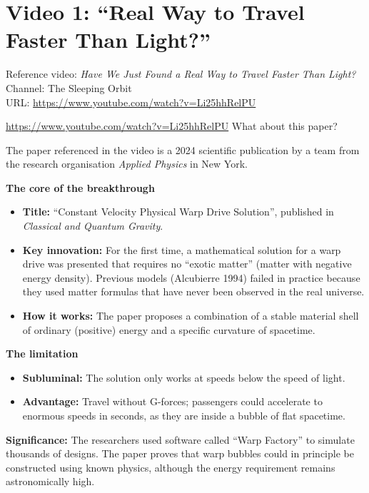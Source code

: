 
\section{Video 1: ``Real Way to Travel Faster Than Light?''}

\begin{videobox}
Reference video: \emph{Have We Just Found a Real Way to Travel Faster Than Light?} \\
Channel: The Sleeping Orbit \\
URL: \url{https://www.youtube.com/watch?v=Li25hhRelPU}
\end{videobox}

\begin{userbox}
\url{https://www.youtube.com/watch?v=Li25hhRelPU} \quad What about this paper?
\end{userbox}

\begin{geminibox}
The paper referenced in the video is a 2024 scientific publication by a team from the research organisation \emph{Applied Physics} in New York.

\textbf{The core of the breakthrough}
\begin{itemize}[leftmargin=1.2em]
  \item \textbf{Title:} ``Constant Velocity Physical Warp Drive Solution'', published in \emph{Classical and Quantum Gravity}.
  \item \textbf{Key innovation:} For the first time, a mathematical solution for a warp drive was presented that requires no ``exotic matter'' (matter with negative energy density). Previous models (Alcubierre 1994) failed in practice because they used matter formulas that have never been observed in the real universe.
  \item \textbf{How it works:} The paper proposes a combination of a stable material shell of ordinary (positive) energy and a specific curvature of spacetime.
\end{itemize}

\textbf{The limitation}
\begin{itemize}[leftmargin=1.2em]
  \item \textbf{Subluminal:} The solution only works at speeds below the speed of light.
  \item \textbf{Advantage:} Travel without G-forces; passengers could accelerate to enormous speeds in seconds, as they are inside a bubble of flat spacetime.
\end{itemize}

\textbf{Significance:} The researchers used software called ``Warp Factory'' to simulate thousands of designs. The paper proves that warp bubbles could in principle be constructed using known physics, although the energy requirement remains astronomically high.
\end{geminibox}

